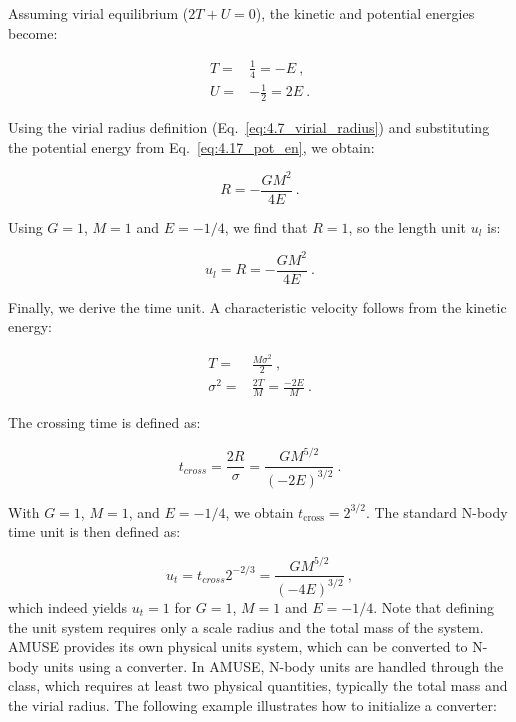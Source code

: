 Assuming virial equilibrium ($2T + U = 0$), the kinetic and potential energies become:

\begin{align}
	T =& \frac{1}{4} = - E ~,\\
	U =& -\frac{1}{2} = 2E ~. \label{eq:4.17_pot_en}
\end{align}

Using the virial radius definition (Eq.~\eqref{eq:4.7_virial_radius}) and substituting the potential energy from Eq.~\eqref{eq:4.17_pot_en}, we obtain:

\begin{equation}
	R = -\frac{GM^2}{4E}~.
\end{equation}

Using $G=1$, $M=1$ and $E=-1/4$, we find that $R=1$, so the length unit $u_l$ is:

\begin{equation}
	u_l = R = -\frac{GM^2}{4E}~.
\end{equation}

Finally, we derive the time unit. A characteristic velocity follows from the kinetic energy:

\begin{align}
	T =& \frac{M \sigma^2}{2} ~,\\
	\sigma^2 =& \frac{2T}{M} = \frac{-2E}{M}~.
\end{align}

The crossing time is defined as:

\begin{equation}
	t_{cross} = \frac{2R}{\sigma} = \frac{GM^{5/2}}{(-2E)^{3/2}}~.
\end{equation}

With $G=1$, $M=1$, and $E=-1/4$, we obtain $t_{\mathrm{cross}} = 2^{3/2}$. The standard N-body time unit is then defined as:

\begin{equation}
	u_t = t_{cross}2^{-2/3} = \frac{GM^{5/2}}{(-4E)^{3/2}}~,
\end{equation}
which indeed yields $u_t = 1$ for $G=1$, $M=1$ and $E=-1/4$. Note that defining the unit system requires only a scale radius and the total mass of the system. AMUSE provides its own physical units system, which can be converted to N-body units using a converter. In AMUSE, N-body units are handled through the  class, which requires at least two physical quantities, typically the total mass and the virial radius. The following example illustrates how to initialize a converter:

